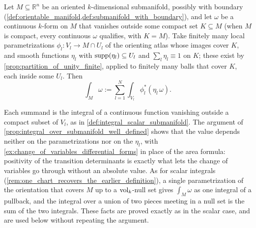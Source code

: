 \begin{definition}
\label{def:integral_of_form_oriented}
Let $M \subseteq \mathbb{R}^n$ be an oriented $k$-dimensional submanifold, possibly with boundary
(\cref{def:orientable_manifold,def:submanifold_with_boundary}), and let $\omega$ be a continuous
$k$-form on $M$ that vanishes outside some compact set $K \subseteq M$ (when $M$ is compact, every
continuous $\omega$ qualifies, with $K = M$). Take finitely many local parametrizations
$\phi_l : V_l \to M \cap U_l$ of the orienting atlas whose images cover $K$, and smooth functions
$\eta_l$ with $\operatorname{supp}(\eta_l) \subseteq U_l$ and $\sum_l \eta_l \equiv 1$ on $K$; these exist by
\cref{prop:partition_of_unity_finite}, applied to finitely many balls that cover $K$, each inside
some $U_l$. Then
\[\int_M \omega := \sum_{l=1}^N \int_{V_l} \phi_l^*(\eta_l\,\omega).\]
\end{definition}

Each summand is the integral of a continuous function vanishing outside a compact subset of $V_l$,
as in \cref{def:integral_scalar_submanifold}. The argument of
\cref{prop:integral_over_submanifold_well_defined} shows that the value depends neither on the
parametrizations nor on the $\eta_l$, with \cref{ex:change_of_variables_differential_forms} in
place of the area formula: positivity of the transition determinants is exactly what lets the
change of variables go through without an absolute value. As for scalar integrals
(\cref{rem:one_chart_recovers_the_earlier_definition}), a single parametrization of the
orientation that covers $M$ up to a $\operatorname{vol}_k$-null set gives $\int_M\omega$ as one integral of a
pullback, and the integral over a union of two pieces meeting in a null set is the sum of the two
integrals. These facts are proved exactly as in the scalar case, and are used below without
repeating the argument.




